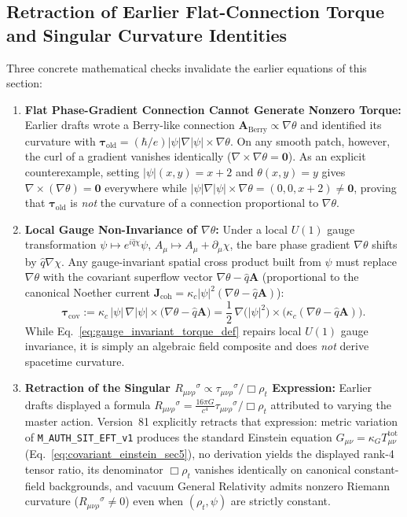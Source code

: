\subsection{Retraction of Earlier Flat-Connection Torque and Singular Curvature Identities}

Three concrete mathematical checks invalidate the earlier equations of this section:
\begin{enumerate}[leftmargin=2em]
  \item \textbf{Flat Phase-Gradient Connection Cannot Generate Nonzero Torque:} Earlier drafts wrote a Berry-like connection $\mathbf{A}_{\mathrm{Berry}} \propto \nabla\theta$ and identified its curvature with $\boldsymbol{\tau}_{\mathrm{old}} = (\hbar/e)|\psi|\nabla|\psi|\times\nabla\theta$. On any smooth patch, however, the curl of a gradient vanishes identically ($\nabla\times\nabla\theta = \mathbf{0}$). As an explicit counterexample, setting $|\psi|(x,y) = x + 2$ and $\theta(x,y) = y$ gives $\nabla\times(\nabla\theta) = \mathbf{0}$ everywhere while $|\psi|\nabla|\psi|\times\nabla\theta = (0, 0, x+2) \ne \mathbf{0}$, proving that $\boldsymbol{\tau}_{\mathrm{old}}$ is \emph{not} the curvature of a connection proportional to $\nabla\theta$.
  \item \textbf{Local Gauge Non-Invariance of $\nabla\theta$:} Under a local $U(1)$ gauge transformation $\psi \mapsto e^{i\hat{q}\chi}\psi$, $A_\mu \mapsto A_\mu + \partial_\mu\chi$, the bare phase gradient $\nabla\theta$ shifts by $\hat{q}\nabla\chi$. Any gauge-invariant spatial cross product built from $\psi$ must replace $\nabla\theta$ with the covariant superflow vector $\nabla\theta - \hat{q}\mathbf{A}$ (proportional to the canonical Noether current $\mathbf{J}_{\mathrm{coh}} = \kappa_c|\psi|^2(\nabla\theta - \hat{q}\mathbf{A})$):
  \begin{equation}
  \boldsymbol{\tau}_{\mathrm{cov}} := \kappa_c\,|\psi|\,\nabla|\psi| \times \bigl(\nabla\theta - \hat{q}\mathbf{A}\bigr)
  = \frac{1}{2}\,\nabla\bigl(|\psi|^2\bigr) \times \bigl(\kappa_c(\nabla\theta - \hat{q}\mathbf{A})\bigr).
  \label{eq:gauge_invariant_torque_def}
  \end{equation}
  While Eq.~\eqref{eq:gauge_invariant_torque_def} repairs local $U(1)$ gauge invariance, it is simply an algebraic field composite and does \emph{not} derive spacetime curvature.
  \item \textbf{Retraction of the Singular $R_{\mu\nu\rho}{}^\sigma \propto \tau_{\mu\nu\rho}{}^\sigma / \Box\rho_t$ Expression:} Earlier drafts displayed a formula $R_{\mu\nu\rho}{}^\sigma = \frac{16\pi G}{c^4}\tau_{\mu\nu\rho}{}^\sigma / \Box\rho_t$ attributed to varying the master action. Version~81 explicitly retracts that expression: metric variation of \texttt{M\_AUTH\_SIT\_EFT\_v1} produces the standard Einstein equation $G_{\mu\nu} = \kappa_G T_{\mu\nu}^{\mathrm{tot}}$ (Eq.~\eqref{eq:covariant_einstein_sec5}), no derivation yields the displayed rank-4 tensor ratio, its denominator $\Box\rho_t$ vanishes identically on canonical constant-field backgrounds, and vacuum General Relativity admits nonzero Riemann curvature ($R_{\mu\nu\rho}{}^\sigma \ne 0$) even when $(\rho_t, \psi)$ are strictly constant.
\end{enumerate}

